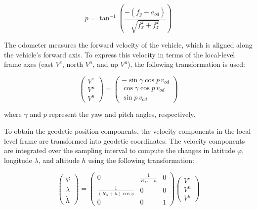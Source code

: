 \documentclass[conference]{IEEEtran}
\begin{document}
\begin{equation}
p = \tan^{-1} \left( \frac{-(f_y - a_{od})}{\sqrt{f_x^2 + f_z^2}} \right)
\label{eq:pitch}
\end{equation}


The odometer measures the forward velocity of the vehicle, which is aligned along the vehicle’s forward axis. To express this velocity in terms of the local-level frame axes (east \( V^e \), north \( V^n \), and up \( V^u \)), the following transformation is used:

\begin{equation}
\begin{pmatrix}
V^e \\
V^n \\
V^u
\end{pmatrix}
=
\begin{pmatrix}
-\sin \gamma \cos p \, v_{od} \\
\cos \gamma \cos p \, v_{od} \\
\sin p \, v_{od}
\end{pmatrix}
\label{eq:velocity_transform}
\end{equation}


where \( \gamma \) and \( p \) represent the yaw and pitch angles, respectively.

To obtain the geodetic position components, the velocity components in the local-level frame are transformed into geodetic coordinates. The velocity components are integrated over the sampling interval to compute the changes in latitude \( \varphi \), longitude \( \lambda \), and altitude \( h \) using the following transformation:

\begin{equation}
\begin{pmatrix}
\dot{\varphi} \\
\dot{\lambda} \\
\dot{h}
\end{pmatrix}
=
\begin{pmatrix}
0 & \frac{1}{R_M + h} & 0 \\
\frac{1}{(R_N + h) \cos \varphi} & 0 & 0 \\
0 & 0 & 1
\end{pmatrix}
\begin{pmatrix}
V^e \\
V^n \\
V^u
\end{pmatrix}
\label{eq:geodetic_transform}
\end{equation}
\end{document}
